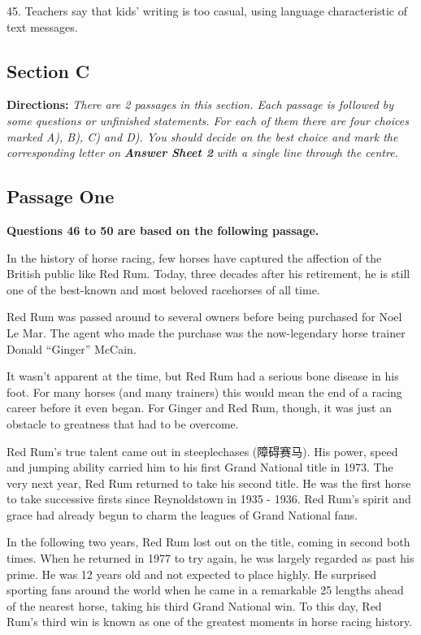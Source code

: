 \documentclass[UTF8,11pt]{ctexart}
\begin{document}
45. Teachers say that kids’ writing is too casual, using language characteristic of text messages.


\subsection*{\textbf{Section C}}


\textbf{Directions: }\textit{There are 2 passages in this section. Each passage is followed by some questions or unfinished} \textit{statements. For each of them there are four choices marked A), B), C) and D). You should decide on the best} \textit{choice and mark the corresponding letter on }\textbf{\textit{Answer Sheet 2}}\textit{ with a single line through the centre.}


\subsection*{\textbf{Passage One}}


\textbf{Questions 46 to 50 are based on the following passage.}


In the history of horse racing, few horses have captured the affection of the British public like Red Rum. Today, three decades after his retirement, he is still one of the best-known and most beloved racehorses of all time.


Red Rum was passed around to several owners before being purchased for Noel Le Mar. The agent who made the purchase was the now-legendary horse trainer Donald “Ginger” McCain.


It wasn’t apparent at the time, but Red Rum had a serious bone disease in his foot. For many horses (and many trainers) this would mean the end of a racing career before it even began. For Ginger and Red Rum, though, it was just an obstacle to greatness that had to be overcome.


Red Rum’s true talent came out in steeplechases (障碍赛马). His power, speed and jumping ability carried him to his first Grand National title in 1973. The very next year, Red Rum returned to take his second title. He was the first horse to take successive firsts since Reynoldstown in 1935 - 1936. Red Rum’s spirit and grace had already begun to charm the leagues of Grand National fans.


In the following two years, Red Rum lost out on the title, coming in second both times. When he returned in 1977 to try again, he was largely regarded as past his prime. He was 12 years old and not expected to place highly. He surprised sporting fans around the world when he came in a remarkable 25 lengths ahead of the nearest horse, taking his third Grand National win. To this day, Red Rum’s third win is known as one of the greatest moments in horse racing history.
\end{document}
